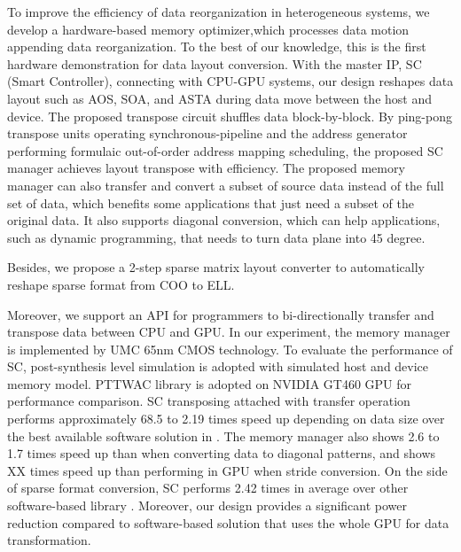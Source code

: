 \documentclass[10pt,journal,compsoc]{IEEEtran}
\begin{document}
To improve the efficiency of data reorganization in heterogeneous systems, we develop a hardware-based memory optimizer,which processes data motion appending data reorganization.
To the best of our knowledge, this is the first hardware demonstration
for data layout conversion.
With the master IP, SC (Smart Controller), connecting with CPU-GPU systems,
our design reshapes data layout such as AOS, SOA, and ASTA
during data move between the host and device.
The proposed transpose circuit shuffles data block-by-block. By ping-pong transpose units operating
synchronous-pipeline and the address generator performing
formulaic out-of-order address mapping scheduling, the proposed SC manager
achieves layout transpose with efficiency.
The proposed memory manager can also transfer and convert a subset of source data instead of the full set of data, which benefits some applications that just need a subset of the original data. It also supports diagonal conversion, which can help applications, such as dynamic programming, that needs to turn data plane into 45 degree.

Besides, we propose a 2-step sparse matrix layout converter to automatically reshape sparse format from COO to ELL.


Moreover, we support an API for programmers to bi-directionally
transfer and transpose data between CPU and GPU.
In our experiment, the memory manager is implemented
by UMC 65nm CMOS technology. To evaluate the performance of SC,
post-synthesis level simulation is adopted with simulated host
and device memory model. PTTWAC library \cite{ASTA} is adopted
on NVIDIA GT460 GPU for performance comparison.
SC transposing attached with transfer operation performs approximately
68.5 to 2.19 times speed up depending on data size
over the best available software solution in \cite{ASTA}.
The memory manager also shows 2.6 to 1.7 times speed up than \cite{Dymaxion} when converting data to diagonal patterns, and shows XX times speed up than performing in GPU when stride conversion.
On the side of sparse format conversion, SC performs
2.42 times in average over other software-based library \cite{Cusp}.
Moreover, our design
provides a significant power reduction compared to software-based
solution that uses the whole GPU for data transformation.


\end{document}
